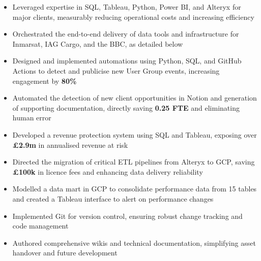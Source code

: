     \begin{paracol}{2}
        \begin{itemize}
            \item Leveraged expertise in SQL, Tableau, Python, Power BI, and Alteryx for major clients, measurably reducing operational costs and increasing efficiency
            \item Orchestrated the end-to-end delivery of data tools and infrastructure for Inmarsat, IAG Cargo, and the BBC, as detailed below
            \item Designed and implemented automations using Python, SQL, and GitHub Actions to detect and publicise new User Group events, increasing engagement by \textbf{80\%}
            \item Automated the detection of new client opportunities in Notion and generation of supporting documentation, directly saving \textbf{0.25 FTE} and eliminating human error
            \\\medskip
                  
        \end{itemize}

        \divider

        \begin{itemize}
            \item Developed a revenue protection system using SQL and Tableau, exposing over \textbf{£2.9m} in annualised revenue at risk
            \item Directed the migration of critical ETL pipelines from Alteryx to GCP, saving \textbf{£100k} in licence fees and enhancing data delivery reliability
            \item Modelled a data mart in GCP to consolidate performance data from 15 tables and created a Tableau interface to alert on performance changes
            \item Implemented Git for version control, ensuring robust change tracking and code management
            \item Authored comprehensive wikis and technical documentation, simplifying asset handover and future development
            \\\medskip
                  
        \end{itemize}


\end{paracol}
